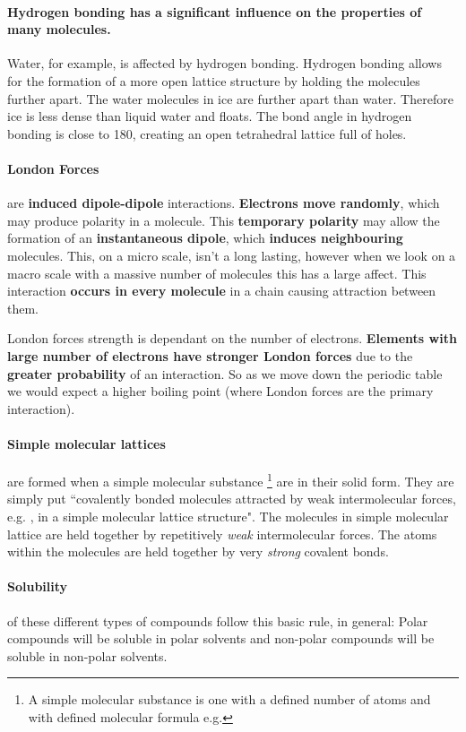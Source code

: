 	\paragraph{Hydrogen bonding has a significant influence on the properties of many molecules.}
	Water, for example, is affected by hydrogen bonding.
	Hydrogen bonding allows for the formation of a more open lattice structure by holding the molecules further apart. The water molecules in ice are further apart than water. Therefore ice is less dense than liquid water and floats. The bond angle in hydrogen bonding is close to 180\degree , creating an open tetrahedral lattice full of holes.
	
	\paragraph{London Forces} are \textbf{induced dipole-dipole} interactions.
	\textbf{Electrons move randomly}, which may produce polarity in a molecule.
	This \textbf{temporary polarity} may allow the formation of an \textbf{instantaneous dipole}, which\textbf{ induces neighbouring} molecules. 
	This, on a micro scale, isn't a long lasting, however when we look on a macro scale with a massive number of molecules this has a large affect.
	This interaction \textbf{occurs in every molecule} in a chain causing attraction between them.
	
	London forces strength is dependant on the number of electrons.
	\textbf{Elements with large number of electrons have stronger London forces} due to the \textbf{greater probability} of an interaction.
	So as we move down the periodic table we would expect a higher boiling point (where London forces are the primary interaction).
	
	\paragraph{Simple molecular lattices} are formed when a simple molecular substance
	\footnote{A simple molecular substance is one with a defined number of atoms and with defined molecular formula e.g. } are in their solid form.
	They are simply put ``covalently bonded molecules attracted by weak intermolecular forces, e.g. , in a simple molecular lattice structure".
	The molecules in simple molecular lattice are held together by repetitively \textit{weak} intermolecular forces. The atoms within the molecules are held together by very \textit{strong} covalent bonds.
	
	\paragraph{Solubility} of these different types of compounds follow this basic rule, in general: Polar compounds will be soluble in polar solvents and non-polar compounds will be soluble in non-polar solvents.
	

